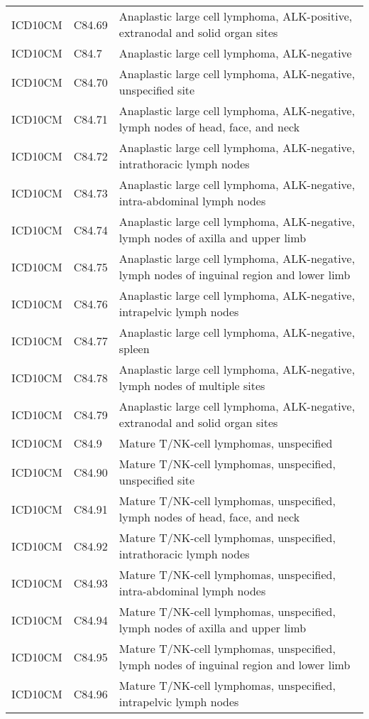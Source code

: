 \begin{table}[ht]
\begin{tabular}{lll}
  ICD10CM & C84.69 & Anaplastic large cell lymphoma, ALK-positive, extranodal and solid organ sites \\ 
  ICD10CM & C84.7 & Anaplastic large cell lymphoma, ALK-negative \\ 
  ICD10CM & C84.70 & Anaplastic large cell lymphoma, ALK-negative, unspecified site \\ 
  ICD10CM & C84.71 & Anaplastic large cell lymphoma, ALK-negative, lymph nodes of head, face, and neck \\ 
  ICD10CM & C84.72 & Anaplastic large cell lymphoma, ALK-negative, intrathoracic lymph nodes \\ 
  ICD10CM & C84.73 & Anaplastic large cell lymphoma, ALK-negative, intra-abdominal lymph nodes \\ 
  ICD10CM & C84.74 & Anaplastic large cell lymphoma, ALK-negative, lymph nodes of axilla and upper limb \\ 
  ICD10CM & C84.75 & Anaplastic large cell lymphoma, ALK-negative, lymph nodes of inguinal region and lower limb \\ 
  ICD10CM & C84.76 & Anaplastic large cell lymphoma, ALK-negative, intrapelvic lymph nodes \\ 
  ICD10CM & C84.77 & Anaplastic large cell lymphoma, ALK-negative, spleen \\ 
  ICD10CM & C84.78 & Anaplastic large cell lymphoma, ALK-negative, lymph nodes of multiple sites \\ 
  ICD10CM & C84.79 & Anaplastic large cell lymphoma, ALK-negative, extranodal and solid organ sites \\ 
  ICD10CM & C84.9 & Mature T/NK-cell lymphomas, unspecified \\ 
  ICD10CM & C84.90 & Mature T/NK-cell lymphomas, unspecified, unspecified site \\ 
  ICD10CM & C84.91 & Mature T/NK-cell lymphomas, unspecified, lymph nodes of head, face, and neck \\ 
  ICD10CM & C84.92 & Mature T/NK-cell lymphomas, unspecified, intrathoracic lymph nodes \\ 
  ICD10CM & C84.93 & Mature T/NK-cell lymphomas, unspecified, intra-abdominal lymph nodes \\ 
  ICD10CM & C84.94 & Mature T/NK-cell lymphomas, unspecified, lymph nodes of axilla and upper limb \\ 
  ICD10CM & C84.95 & Mature T/NK-cell lymphomas, unspecified, lymph nodes of inguinal region and lower limb \\ 
  ICD10CM & C84.96 & Mature T/NK-cell lymphomas, unspecified, intrapelvic lymph nodes \\ 

\end{tabular}
\end{table}
